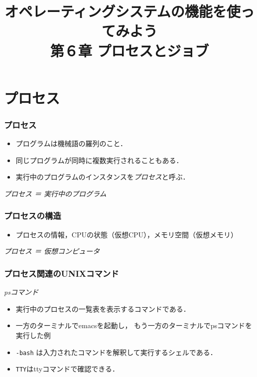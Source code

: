 \documentclass{beamer}                 %
\begin{document}
\title{オペレーティングシステムの機能を使ってみよう\\
第６章 プロセスとジョブ}
\date{}

\begin{frame}
  \titlepage
\end{frame}


\section{プロセス}
\begin{frame}[fragile]
  \frametitle{プロセス}

  \begin{itemize}
    \item プログラムは機械語の羅列のこと．
    \item 同じプログラムが同時に複数実行されることもある．
    \item 実行中のプログラムのインスタンスを\emph{プロセス}と呼ぶ．
  \end{itemize}

  \begin{center}
    \emph{\Large プロセス ＝ 実行中のプログラム}
  \end{center}
\end{frame}

\begin{frame}[fragile]
  \frametitle{プロセスの構造}

  \begin{itemize}
    \item プロセスの情報，CPUの状態（仮想CPU），メモリ空間（仮想メモリ）
  \end{itemize}

  \begin{center}
    \emph{\Large プロセス ＝ 仮想コンピュータ}
  \end{center}
\end{frame}

\begin{frame}[fragile]
  \frametitle{プロセス関連のUNIXコマンド}
  \emph{psコマンド}
  \begin{itemize}
  \item 実行中のプロセスの一覧表を表示するコマンドである．
  \item 一方のターミナルでemacsを起動し，
    もう一方のターミナルでpsコマンドを実行した例
  \item \texttt{-bash} は入力されたコマンドを解釈して実行するシェルである．
  \item \texttt{TTY}はttyコマンドで確認できる．
  \end{itemize}
\end{frame}
\end{document}

